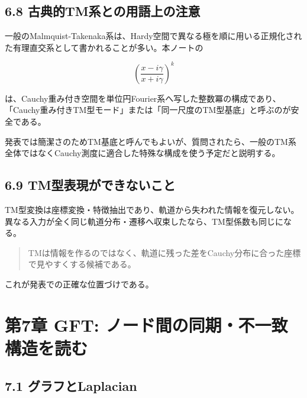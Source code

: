 \documentclass[11pt,a4paper]{ltjsarticle}
\newenvironment{keyquote}{%
  \begin{quote}\color{researchteal}\bfseries\large%
}{%
  \end{quote}%
}
\begin{document}
\subsection*{\textcolor{researchblue}{6.8 古典的TM系との用語上の注意}}

一般のMalmquist-Takenaka系は、Hardy空間で異なる極を順に用いる正規化された有理直交系として書かれることが多い。本ノートの\par

\[
\left(\frac{x-i\gamma}{x+i\gamma}\right)^k
\]

は、Cauchy重み付き空間を単位円Fourier系へ写した整数冪の構成であり、「Cauchy重み付きTM型モード」または「同一尺度のTM型基底」と呼ぶのが安全である。\par

発表では簡潔さのためTM基底と呼んでもよいが、質問されたら、一般のTM系全体ではなくCauchy測度に適合した特殊な構成を使う予定だと説明する。\par

\subsection*{\textcolor{researchblue}{6.9 TM型表現ができないこと}}

TM型変換は座標変換・特徴抽出であり、軌道から失われた情報を復元しない。異なる入力が全く同じ軌道分布・遷移へ収束したなら、TM型係数も同じになる。\par

\begin{keyquote}

TMは情報を作るのではなく、軌道に残った差をCauchy分布に合った座標で見やすくする候補である。

\end{keyquote}

これが発表での正確な位置づけである。\par

\goodbreak

\section*{\textcolor{researchink}{第7章 GFT: ノード間の同期・不一致構造を読む}}


\subsection*{\textcolor{researchblue}{7.1 グラフとLaplacian}}
\end{document}
